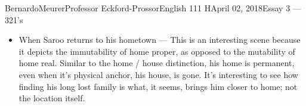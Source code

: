 \documentclass[12pt,letterpaper]{article}
\begin{document}
\begin{mla}{Bernardo}{Meurer}{Professor Eckford-Prossor}{English 111 H}{April 02, 2018}{Essay 3 --- 321's}
\begin{itemize}
    In another of his poems, ``Deslumbramentos'' or `Dazzles'' (Note that I do not believe that ``Dazzle'' is a fair translation of the Portuguese original, but after much thought I have failed to come up with any better alternative, and therefore will use ``Dazzles'') he explores the dangers of contemplating an unattainable love.
    I'm not sure where to go with this, but I feel like with some more thought I might be able to connect this to how we understand who we are, or at least with the ``cognitive dissonance'' of the city. Also, this point makes me think of Chopin's Preludes, not entirely sure how to relate it rigorously yet.
\item When Saroo returns to his hometown --- This is an interesting scene because it depicts the immutability of home proper, as opposed to the mutability of home real. Similar to the home / house distinction, his home is permanent, even when it's physical anchor, his house, is gone. It's interesting to see how finding his long lost family is what, it seems, brings him closer to home; not the location itself.
    \end{itemize}
    \newpage

\end{mla}
\end{document}
